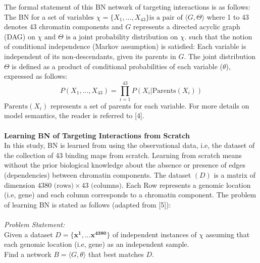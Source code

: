 \documentclass{bioinfo}
\begin{document}
\begin{methods}
The formal statement of this BN network of targeting interactions is as follows: The BN for a set of variables \( \chi = \{X_1, ..., X_{43}\} \text{is a pair of } \langle  G, \Theta  \rangle\)
where 1 to 43 denotes 43 chromatin components and \(G\) represents a directed acyclic graph (DAG) on 
\( \chi \text{ and } \Theta \text{ is a joint probability distribution on } \chi \). 
such that the notion of conditional independence (Markov assumption) is satisfied: Each variable is independent of its non-descendants, given its parents in \(G\). The joint distribution \( \Theta \) is defined as a product of conditional probabilities of each variable (\( \theta \)), expressed as follows:
\[ 
P(X_1, ..., X_{43}) = \prod_{i=1}^{43} P(X_i|\text{Parents}(X_i)) 
\]
\(\text{Parents}(X_i)\) represents a set of parents for each variable. For more details on model semantics, the reader is referred to [4].\\
\\
\textbf{Learning BN of Targeting Interactions from Scratch}\\
In this study, BN is learned from using the observational data, i.e, the dataset of the collection of 43 binding maps from scratch. Learning from scratch means without  the prior biological knowledge about the absence or presence of edges (dependencies) between chromatin components. The dataset \((D)\) is a matrix of dimension \(4380\text{ (rows)} \times 43\text{ (columns)}\). Each Row represents a genomic location (i.e, gene) and each column corresponds to a chromatin component.
The problem of learning BN is stated as follows (adapted from [5]):\\
\\
\textit{Problem Statement:}\\
Given a dataset \(D=\{\mathbf{x^1, ... x^{4380}} \} \) of independent instances of \(\chi\) assuming that each genomic location (i.e, gene) as an independent sample.\\
Find a network \(B=\langle  G, \theta  \rangle \) that best matches \(D\). \\


\end{methods}
\end{document}
